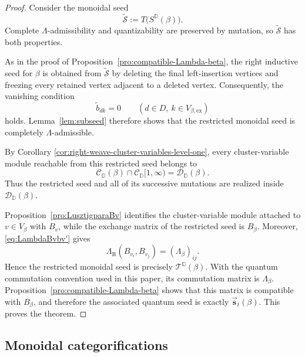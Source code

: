 \documentclass[12pt, reqno]{amsart}
\theoremstyle{plain}
\theoremstyle{definition}
\numberwithin{equation}{section}
\newcommand{\DD}{\mathbb{D}}
\newcommand{\LambdaR}{\Lambda_{\mathrm R}}
\begin{document}
\begin{proof}
Consider the monoidal seed
\begin{equation*}
    \widetilde{\mathcal S}
    :=
    T\bigl(S^{\DD}(\beta)\bigr).
\end{equation*}
Complete \(\Lambda\)-admissibility and quantizability are preserved by
mutation, so \(\widetilde{\mathcal S}\) has both properties.

As in the proof of Proposition~\ref{pro:compatible-Lambda-beta}, the right
inductive seed for \(\beta\) is obtained from
\(\widetilde{\mathcal S}\) by deleting the final left-insertion
vertices and freezing every retained vertex adjacent to a deleted
vertex. Consequently, the vanishing condition
\begin{equation*}
    \widetilde b_{dk}=0
    \qquad
    (d\in D,\ k\in V_{\beta,\mathrm{ex}})
\end{equation*}
holds. Lemma~\ref{lem:subseed} therefore shows that the restricted
monoidal seed is completely \(\Lambda\)-admissible.

By Corollary \ref{cor:right-weave-cluster-variables-level-one}, every cluster-variable module
reachable from this restricted seed belongs to
\begin{equation*}
    \mathscr C_{\DD}(\beta)
    \cap\mathscr C_{\DD}[1,\infty)
    =
    \mathscr D_{\DD}(\beta).
\end{equation*}
Thus the restricted seed and all of its successive mutations are
realized inside \(\mathscr D_{\DD}(\beta)\).

Proposition~\ref{pro:LusztigparaBv} identifies the cluster-variable
module attached to \(v\in V_\beta\) with \(B_v\), while the exchange
matrix of the restricted seed is \(B_\beta\). Moreover,
\eqref{eq:LambdaBvbv'} gives
\begin{equation*}
    \LambdaR(B_{v_i},B_{v_j})
    =
    (\Lambda_\beta)_{ij}.
\end{equation*}
Hence the restricted monoidal seed is precisely
\(\mathcal T^{\DD}(\beta)\). With the quantum commutation convention
used in this paper, its commutation matrix is
\(\Lambda_\beta\). Proposition~\ref{pro:compatible-Lambda-beta} shows that
this matrix is compatible with \(B_\beta\), and therefore the
associated quantum seed is exactly
\(\overrightarrow{\mathbf s}_t(\beta)\). This proves the theorem.
\end{proof}


\subsection{Monoidal categorifications}
\end{document}
